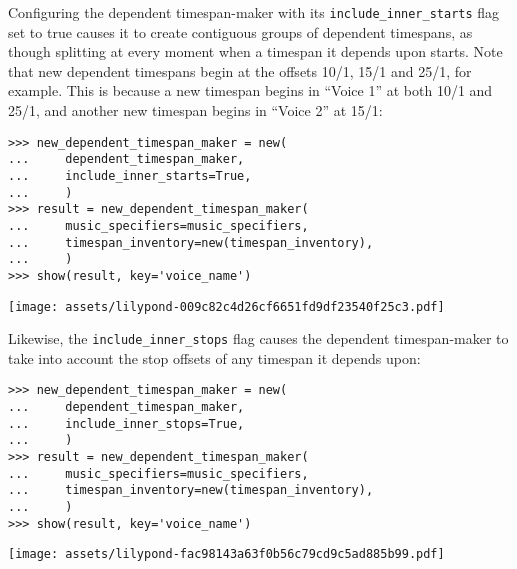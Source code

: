 Configuring the dependent timespan-maker with its
\texttt{include\_inner\_starts} flag set to true causes it to create contiguous
groups of dependent timespans, as though splitting at every moment when a
timespan it depends upon starts. Note that new dependent timespans begin at the
offsets 10/1, 15/1 and 25/1, for example. This is because a new timespan begins
in \enquote{Voice 1} at both 10/1 and 25/1, and another new timespan begins in
\enquote{Voice 2} at 15/1:

\begin{comment}
<abjad>
new_dependent_timespan_maker = new(
    dependent_timespan_maker,
    include_inner_starts=True,
    )
result = new_dependent_timespan_maker(
    music_specifiers=music_specifiers,
    timespan_inventory=new(timespan_inventory),
    )
show(result, key='voice_name')
</abjad>
\end{comment}

\begin{abjadbookoutput}
\begin{singlespacing}
\vspace{-0.5\baselineskip}
\begin{lstlisting}
>>> new_dependent_timespan_maker = new(
...     dependent_timespan_maker,
...     include_inner_starts=True,
...     )
>>> result = new_dependent_timespan_maker(
...     music_specifiers=music_specifiers,
...     timespan_inventory=new(timespan_inventory),
...     )
>>> show(result, key='voice_name')
\end{lstlisting}
\noindent\texttt{[image: assets/lilypond-009c82c4d26cf6651fd9df23540f25c3.pdf]}
\end{singlespacing}
\end{abjadbookoutput}

\noindent Likewise, the \texttt{include\_inner\_stops} flag causes the
dependent timespan-maker to take into account the stop offsets of any timespan
it depends upon:

\begin{comment}
<abjad>
new_dependent_timespan_maker = new(
    dependent_timespan_maker,
    include_inner_stops=True,
    )
result = new_dependent_timespan_maker(
    music_specifiers=music_specifiers,
    timespan_inventory=new(timespan_inventory),
    )
show(result, key='voice_name')
</abjad>
\end{comment}

\begin{abjadbookoutput}
\begin{singlespacing}
\vspace{-0.5\baselineskip}
\begin{lstlisting}
>>> new_dependent_timespan_maker = new(
...     dependent_timespan_maker,
...     include_inner_stops=True,
...     )
>>> result = new_dependent_timespan_maker(
...     music_specifiers=music_specifiers,
...     timespan_inventory=new(timespan_inventory),
...     )
>>> show(result, key='voice_name')
\end{lstlisting}
\noindent\texttt{[image: assets/lilypond-fac98143a63f0b56c79cd9c5ad885b99.pdf]}
\end{singlespacing}
\end{abjadbookoutput}

